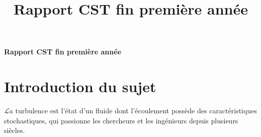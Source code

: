 \documentclass[a4paper,12pt]{article}
\title{\navy \textbf{Rapport CST fin première année} \color{black}}%
\date{}
\newcommand\bk{\color{black}}
\newcommand\navy{\color{navy}}
\numberwithin{equation}{section} %
\begin{document}
\begin{titlepage} \centering
\vspace*{\fill}
\Huge \navy \textbf{Rapport CST fin première année} \bk \normalsize
\vspace*{\fill}
\end{titlepage}
\newpage

\navy \section{Introduction du sujet}  \bk
\Large{$\mathscr{L}$}\normalsize a turbulence est l'état d'un fluide dont l'écoulement possède des caractéristiques stochastiques, qui passionne les chercheurs et les ingénieurs depuis plusieurs siècles.\\ 

\end{document}
